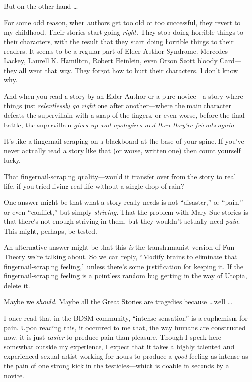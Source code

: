 {
 But on the other hand \ldots}

{
 For some odd reason, when authors get too old or too successful,
they revert to my childhood. Their stories start going \textit{right.}
They stop doing horrible things to their characters, with the result
that they start doing horrible things to their readers. It seems to be
a regular part of Elder Author Syndrome. Mercedes Lackey, Laurell K.
Hamilton, Robert Heinlein, even Orson Scott bloody Card---they all went
that way. They forgot how to hurt their characters. I
don't know why.}

{
 And when you read a story by an Elder Author or a pure novice---a
story where things just \textit{relentlessly go right} one after
another---where the main character defeats the supervillain with a snap
of the fingers, or even worse, before the final battle, the
supervillain \textit{gives up and apologizes and then
they're friends again---}}

{
 It's like a fingernail scraping on a blackboard at
the base of your spine. If you've never actually read a
story like that (or worse, written one) then count yourself lucky.}

{
 That fingernail-scraping quality---would it transfer over from the
story to real life, if you tried living real life without a single drop
of rain?}

{
 One answer might be that what a story really needs is not
``disaster,'' or
``pain,'' or even
``conflict,'' but simply
\textit{striving.} That the problem with Mary Sue stories is that
there's not enough striving in them, but they
wouldn't actually need \textit{pain}. This might,
perhaps, be tested.}

{
 An alternative answer might be that this \textit{is} the
transhumanist version of Fun Theory we're talking
about. So we can reply, ``Modify brains to eliminate
that fingernail-scraping feeling,'' unless
there's some justification for keeping it. If the
fingernail-scraping feeling is a pointless random bug getting in the
way of Utopia, delete it.}

{
 Maybe we \textit{should}. Maybe all the Great Stories are
tragedies because \ldots well \ldots}

{
 I once read that in the BDSM community, ``intense
sensation'' is a euphemism for pain. Upon reading
this, it occurred to me that, the way humans are constructed now, it is
just \textit{easier} to produce pain than pleasure. Though I speak here
somewhat outside my experience, I expect that it takes a highly
talented and experienced sexual artist working for hours to produce a
\textit{good} feeling as intense as the pain of one strong kick in the
testicles---which is doable in seconds by a novice.}

